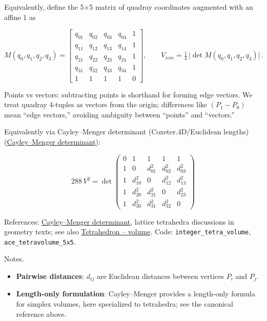 \documentclass[
  10pt,
]{article}
\providecommand{\tightlist}{%
  \setlength{\itemsep}{0pt}\setlength{\parskip}{0pt}}
\begin{document}
Equivalently, define the 5×5 matrix of quadray coordinates augmented
with an affine 1 as

\begin{equation}\label{eq:ace5x5_expanded}
M(q_0,q_1,q_2,q_3) = \begin{bmatrix}
q_{01} & q_{02} & q_{03} & q_{04} & 1 \\
q_{11} & q_{12} & q_{13} & q_{14} & 1 \\
q_{21} & q_{22} & q_{23} & q_{24} & 1 \\
q_{31} & q_{32} & q_{33} & q_{34} & 1 \\
1 & 1 & 1 & 1 & 0
\end{bmatrix},\qquad V_{ivm} = \tfrac{1}{4}\,\big|\det M(q_0,q_1,q_2,q_3)\big|\,.
\end{equation}

Points vs vectors: subtracting points is shorthand for forming edge
vectors. We treat quadray 4-tuples as vectors from the origin;
differences like \((P_1-P_0)\) mean ``edge vectors,'' avoiding ambiguity
between ``points'' and ``vectors.''

Equivalently via Cayley--Menger determinant (Coxeter.4D/Euclidean
lengths)
(\href{https://en.wikipedia.org/wiki/Cayley\%E2\%80\%93Menger_determinant}{Cayley--Menger
determinant}):

\begin{equation}\label{eq:cayley_menger}
288\,V^2 = \det\begin{pmatrix}
  0 & 1 & 1 & 1 & 1 \\
  1 & 0 & d_{01}^2 & d_{02}^2 & d_{03}^2 \\
  1 & d_{10}^2 & 0 & d_{12}^2 & d_{13}^2 \\
  1 & d_{20}^2 & d_{21}^2 & 0 & d_{23}^2 \\
  1 & d_{30}^2 & d_{31}^2 & d_{32}^2 & 0
\end{pmatrix}
\end{equation}

References:
\href{https://en.wikipedia.org/wiki/Cayley\%E2\%80\%93Menger_determinant}{Cayley--Menger
determinant}, lattice tetrahedra discussions in geometry texts; see also
\href{https://en.wikipedia.org/wiki/Tetrahedron\#Volume}{Tetrahedron --
volume}. Code: \texttt{integer\_tetra\_volume},
\texttt{ace\_tetravolume\_5x5}.

Notes.

\begin{itemize}
\tightlist
\item
  \textbf{Pairwise distances}: \(d_{ij}\) are Euclidean distances
  between vertices \(P_i\) and \(P_j\).
\item
  \textbf{Length-only formulation}: Cayley--Menger provides a
  length-only formula for simplex volumes, here specialized to
  tetrahedra; see the canonical reference above.
\end{itemize}
\end{document}
